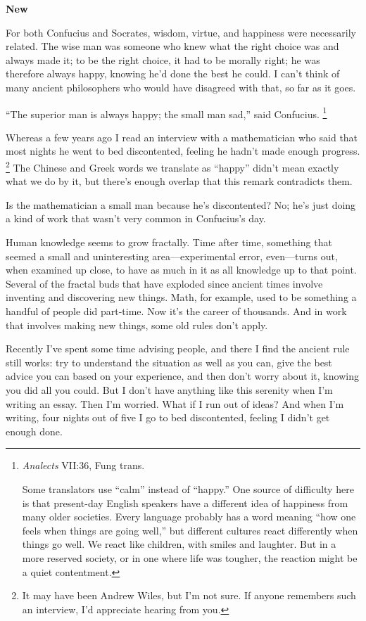 \textbf{New}

For both Confucius and Socrates, wisdom, virtue, and happiness were
necessarily related. The wise man was someone who knew what the right
choice was and always made it; to be the right choice, it had to be
morally right; he was therefore always happy, knowing he'd done the best
he could. I can't think of many ancient philosophers who would have
disagreed with that, so far as it goes.

``The superior man is always happy; the small man sad,'' said Confucius.
\footnote{\emph{Analects} VII:36, Fung trans.

Some translators use ``calm'' instead of ``happy.'' One source of
difficulty here is that present-day English speakers have a different
idea of happiness from many older societies. Every language probably has
a word meaning ``how one feels when things are going well,'' but
different cultures react differently when things go well. We react like
children, with smiles and laughter. But in a more reserved society, or
in one where life was tougher, the reaction might be a quiet
contentment.}

Whereas a few years ago I read an interview with a mathematician who
said that most nights he went to bed discontented, feeling he hadn't
made enough progress. \footnote{It may have been Andrew Wiles, but I'm not sure. If anyone
remembers such an interview, I'd appreciate hearing from you.} The Chinese and Greek
words we translate as ``happy'' didn't mean exactly what we do by it,
but there's enough overlap that this remark contradicts them.

Is the mathematician a small man because he's discontented? No; he's
just doing a kind of work that wasn't very common in Confucius's day.

Human knowledge seems to grow fractally. Time after time, something that
seemed a small and uninteresting area---experimental error, even---turns
out, when examined up close, to have as much in it as all knowledge up
to that point. Several of the fractal buds that have exploded since
ancient times involve inventing and discovering new things. Math, for
example, used to be something a handful of people did part-time. Now
it's the career of thousands. And in work that involves making new
things, some old rules don't apply.

Recently I've spent some time advising people, and there I find the
ancient rule still works: try to understand the situation as well as you
can, give the best advice you can based on your experience, and then
don't worry about it, knowing you did all you could. But I don't have
anything like this serenity when I'm writing an essay. Then I'm worried.
What if I run out of ideas? And when I'm writing, four nights out of
five I go to bed discontented, feeling I didn't get enough done.

